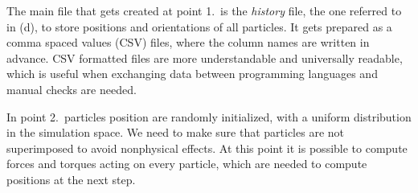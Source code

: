 \documentclass[../../master_thesis_np.tex]{subfiles}
\begin{document}
	The main file that gets created at point 1.\ is the \emph{history} file, the one referred to in (d), to store positions and orientations of all particles. 
	It gets prepared as a comma spaced values (CSV) files, where the column names are written in advance. 
	CSV formatted files are more understandable and universally readable, which is useful when exchanging data between programming languages and manual checks are needed.
	
	In point 2.\ particles position are randomly initialized, with a uniform distribution in the simulation space. 
	We need to make sure that particles are not superimposed to avoid nonphysical effects. 
	At this point it is possible to compute forces and torques acting on every particle, which are needed to compute positions at the next step.
	
\end{document}
